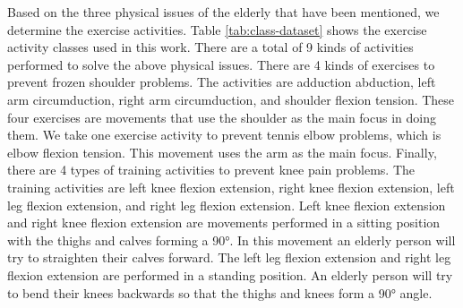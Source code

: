 Based on the three physical issues of the elderly that have been mentioned, we determine the exercise activities. Table \ref{tab:class-dataset} shows the exercise activity classes used in this work. There are a total of 9 kinds of activities performed to solve the above physical issues. There are 4 kinds of exercises to prevent frozen shoulder problems. The activities are adduction abduction, left arm circumduction, right arm circumduction, and shoulder flexion tension. These four exercises are movements that use the shoulder as the main focus in doing them. We take one exercise activity to prevent tennis elbow problems, which is elbow flexion tension. This movement uses the arm as the main focus. Finally, there are 4 types of training activities to prevent knee pain problems. The training activities are left knee flexion extension, right knee flexion extension, left leg flexion extension, and right leg flexion extension. Left knee flexion extension and right knee flexion extension are movements performed in a sitting position with the thighs and calves forming a \ang{90}. In this movement an elderly person will try to straighten their calves forward. The left leg flexion extension and right leg flexion extension are performed in a standing position. An elderly person will try to bend their knees backwards so that the thighs and knees form a \ang{90} angle.

